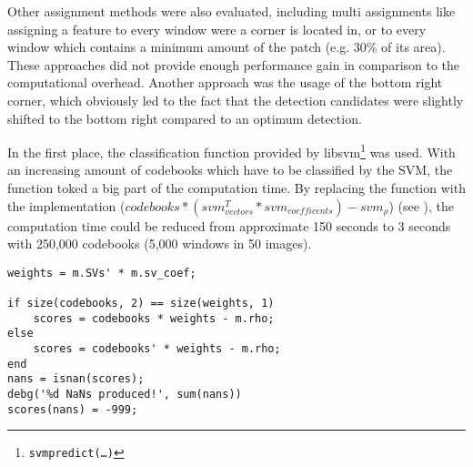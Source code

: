 Other assignment methods were also evaluated, including multi assignments like assigning a feature to every window were a corner is located in, or to every window which contains a minimum amount of the patch (e.g. 30\% of its area). These approaches did not provide enough performance gain in comparison to the computational overhead. Another approach was the usage of the bottom right corner, which obviously led to the fact that the detection candidates were slightly shifted to the bottom right compared to an optimum detection. 

In the first place, the classification function provided by libsvm\footnote{\texttt{svmpredict(\dots)}} was used. With an increasing amount of codebooks which have to be classified by the \ac{SVM}, the function toked a big part of the computation time. By replacing the function with the \MATLAB implementation ($codebooks * (svm_{vectors}^T * svm_{coefficents}) - svm_{\rho}$) (see ), the computation time could be reduced from approximate 150 seconds to 3 seconds with 250,000 codebooks (5,000 windows in 50 images).


\begin{lstlisting}[caption={\MATLAB variant of svmpredict},label=lst:matlab_svm_predict]
weights = m.SVs' * m.sv_coef;

if size(codebooks, 2) == size(weights, 1)
    scores = codebooks * weights - m.rho;
else
    scores = codebooks' * weights - m.rho;
end
nans = isnan(scores);
debg('%d NaNs produced!', sum(nans))
scores(nans) = -999;
\end{lstlisting}
